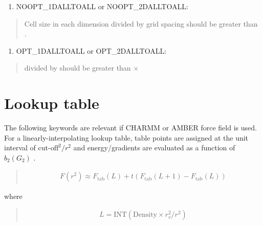 \documentclass[a4paper,11pt,oneside,english]{sphinxmanual}
\begin{document}
\begin{enumerate}
\def\theenumi{\arabic{enumi}}
\def\labelenumi{\theenumi )}
\makeatletter\def\p@enumii{\p@enumi \theenumi )}\makeatother
\setcounter{enumi}{2}
\item {} 
NOOPT\_1DALLTOALL or NOOPT\_2DALLTOALL:

\end{enumerate}
\begin{quote}

Cell size in each dimension divided by grid spacing should be greater than .
\end{quote}
\begin{enumerate}
\def\theenumi{\arabic{enumi}}
\def\labelenumi{\theenumi )}
\makeatletter\def\p@enumii{\p@enumi \theenumi )}\makeatother
\setcounter{enumi}{3}
\item {} 
OPT\_1DALLTOALL or OPT\_2DALLTOALL:

\end{enumerate}
\begin{quote}

 divided by  should be greater than \(\times\) 
\end{quote}


\section{Lookup table}
\label{\detokenize{05_Energy:lookup-table}}
The following keywords are relevant if CHARMM or AMBER force field is used.
For a linearly-interpolating lookup table, table points are assigned
at the unit interval of \(\text{cut-off}^2/r^2\)
and energy/gradients are evaluated as a function of \(b_2(G_2)\) .
\begin{quote}

\vspace{-5mm}
\begin{equation*}
\begin{split}F(r^2) \approx F_{\text{tab}}(L)+t(F_{\text{tab}}(L+1)-F_{\text{tab}}(L))\end{split}
\end{equation*}
\vspace{-3mm}
\end{quote}

where
\begin{quote}

\vspace{-5mm}
\begin{equation*}
\begin{split}L=\text{INT}(\text{Density} \times r_v^2/r^2)\end{split}
\end{equation*}
\vspace{-3mm}
\end{quote}
\end{document}
